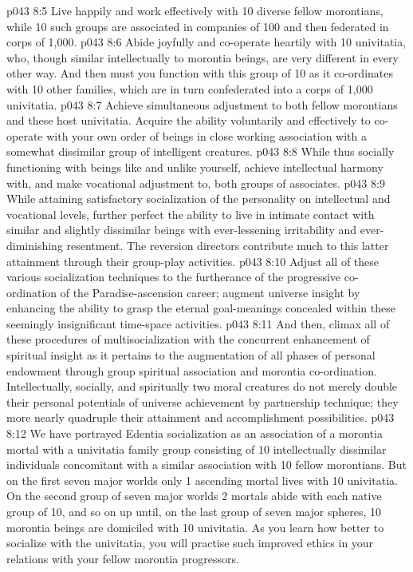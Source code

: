 \vs p043 8:5 \bibnobreakspace Live happily and work effectively with 10 diverse fellow morontians, while 10 such groups are associated in companies of 100 and then federated in corps of 1,000.
\vs p043 8:6 \bibnobreakspace Abide joyfully and co\hyp{}operate heartily with 10 univitatia, who, though similar intellectually to morontia beings, are very different in every other way. And then must you function with this group of 10 as it co\hyp{}ordinates with 10 other families, which are in turn confederated into a corps of 1,000 univitatia.
\vs p043 8:7 \bibnobreakspace Achieve simultaneous adjustment to both fellow morontians and these host univitatia. Acquire the ability voluntarily and effectively to co\hyp{}operate with your own order of beings in close working association with a somewhat dissimilar group of intelligent creatures.
\vs p043 8:8 \bibnobreakspace While thus socially functioning with beings like and unlike yourself, achieve intellectual harmony with, and make vocational adjustment to, both groups of associates.
\vs p043 8:9 \bibnobreakspace While attaining satisfactory socialization of the personality on intellectual and vocational levels, further perfect the ability to live in intimate contact with similar and slightly dissimilar beings with ever\hyp{}lessening irritability and ever\hyp{}diminishing resentment. The reversion directors contribute much to this latter attainment through their group\hyp{}play activities.
\vs p043 8:10 \bibnobreakspace Adjust all of these various socialization techniques to the furtherance of the progressive co\hyp{}ordination of the Paradise\hyp{}ascension career; augment universe insight by enhancing the ability to grasp the eternal goal\hyp{}meanings concealed within these seemingly insignificant time\hyp{}space activities.
\vs p043 8:11 \bibnobreakspace And then, climax all of these procedures of multisocialization with the concurrent enhancement of spiritual insight as it pertains to the augmentation of all phases of personal endowment through group spiritual association and morontia co\hyp{}ordination. Intellectually, socially, and spiritually two moral creatures do not merely double their personal potentials of universe achievement by partnership technique; they more nearly quadruple their attainment and accomplishment possibilities.
\vs p043 8:12 \pc We have portrayed Edentia socialization as an association of a morontia mortal with a univitatia family group consisting of 10 intellectually dissimilar individuals concomitant with a similar association with 10 fellow morontians. But on the first seven major worlds only 1 ascending mortal lives with 10 univitatia. On the second group of seven major worlds 2 mortals abide with each native group of 10, and so on up until, on the last group of seven major spheres, 10 morontia beings are domiciled with 10 univitatia. As you learn how better to socialize with the univitatia, you will practise such improved ethics in your relations with your fellow morontia progressors.
